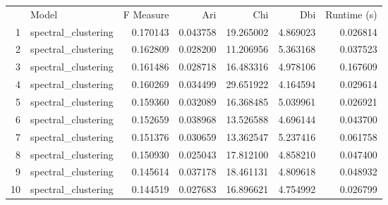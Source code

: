 \begin{tabular}{rlrrrrr}
 & Model & F Measure & Ari & Chi & Dbi & Runtime (s) \\
1 & spectral_clustering & 0.170143 & 0.043758 & 19.265002 & 4.869023 & 0.026814 \\
2 & spectral_clustering & 0.162809 & 0.028200 & 11.206956 & 5.363168 & 0.037523 \\
3 & spectral_clustering & 0.161486 & 0.028718 & 16.483316 & 4.978106 & 0.167609 \\
4 & spectral_clustering & 0.160269 & 0.034499 & 29.651922 & 4.164594 & 0.029614 \\
5 & spectral_clustering & 0.159360 & 0.032089 & 16.368485 & 5.039961 & 0.026921 \\
6 & spectral_clustering & 0.152659 & 0.038968 & 13.526588 & 4.696144 & 0.043700 \\
7 & spectral_clustering & 0.151376 & 0.030659 & 13.362547 & 5.237416 & 0.061758 \\
8 & spectral_clustering & 0.150930 & 0.025043 & 17.812100 & 4.858210 & 0.047400 \\
9 & spectral_clustering & 0.145614 & 0.037178 & 18.461131 & 4.809618 & 0.048932 \\
10 & spectral_clustering & 0.144519 & 0.027683 & 16.896621 & 4.754992 & 0.026799 \\
\end{tabular}
